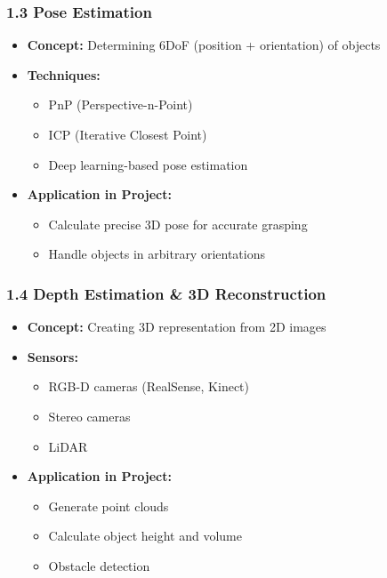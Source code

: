\documentclass[
]{article}
\providecommand{\tightlist}{%
  \setlength{\itemsep}{0pt}\setlength{\parskip}{0pt}}
\begin{document}
\hypertarget{pose-estimation}{%
\subsubsection{1.3 Pose Estimation}\label{pose-estimation}}

\begin{itemize}
\tightlist
\item
  \textbf{Concept:} Determining 6DoF (position + orientation) of objects
\item
  \textbf{Techniques:}

  \begin{itemize}
  \tightlist
  \item
    PnP (Perspective-n-Point)
  \item
    ICP (Iterative Closest Point)
  \item
    Deep learning-based pose estimation
  \end{itemize}
\item
  \textbf{Application in Project:}

  \begin{itemize}
  \tightlist
  \item
    Calculate precise 3D pose for accurate grasping
  \item
    Handle objects in arbitrary orientations
  \end{itemize}
\end{itemize}

\hypertarget{depth-estimation-3d-reconstruction}{%
\subsubsection{1.4 Depth Estimation \& 3D
Reconstruction}\label{depth-estimation-3d-reconstruction}}

\begin{itemize}
\tightlist
\item
  \textbf{Concept:} Creating 3D representation from 2D images
\item
  \textbf{Sensors:}

  \begin{itemize}
  \tightlist
  \item
    RGB-D cameras (RealSense, Kinect)
  \item
    Stereo cameras
  \item
    LiDAR
  \end{itemize}
\item
  \textbf{Application in Project:}

  \begin{itemize}
  \tightlist
  \item
    Generate point clouds
  \item
    Calculate object height and volume
  \item
    Obstacle detection
  \end{itemize}
\end{itemize}
\end{document}
